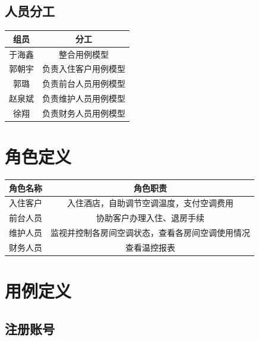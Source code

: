 \documentclass[blue,normal,cn]{elegantnote}
\begin{document}
\subsection{人员分工}

\begin{center}
    \begin{tabular}{cc}
        \toprule
        \textbf{组员} & \textbf{分工}        \\
        \midrule
        于海鑫        & 整合用例模型         \\
        郭朝宇        & 负责入住客户用例模型 \\
        郭璐          & 负责前台人员用例模型 \\
        赵泉斌        & 负责维护人员用例模型 \\
        徐翔          & 负责财务人员用例模型 \\
        \bottomrule
    \end{tabular}
\end{center}

\section{角色定义}

\begin{center}
    \begin{tabular}{cc}
        \toprule
        \textbf{角色名称} & \textbf{角色职责}                                \\
        \midrule
        入住客户          & 入住酒店，自助调节空调温度，支付空调费用         \\
        前台人员          & 协助客户办理入住、退房手续                       \\
        维护人员          & 监视并控制各房间空调状态，查看各房间空调使用情况 \\
        财务人员          & 查看温控报表                                     \\
        \bottomrule
    \end{tabular}
\end{center}

\section{用例定义}

\subsection{注册账号}
\end{document}
